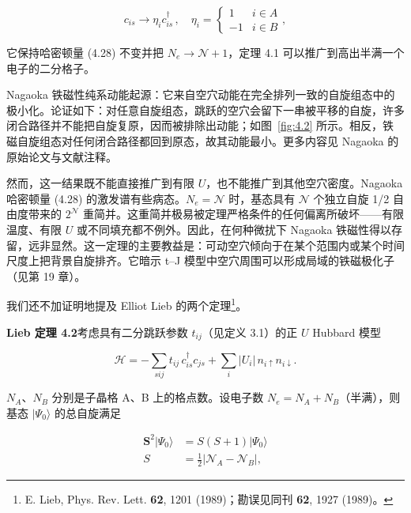\begin{equation*}
c _ {is} \rightarrow \eta_ {i} c _ {is} ^ {\dagger} \, , \quad \eta_ {i} = \left\{\begin{array}{ll}1 & i \in A\\- 1 & i \in B\end{array}\right.,
\tag{4.31}
\end{equation*}

它保持哈密顿量 (4.28) 不变并把 $N_e \to \mathcal{N} + 1$，定理 4.1 可以推广到高出半满一个电子的二分格子。

Nagaoka 铁磁性纯系动能起源：它来自空穴动能在完全排列一致的自旋组态中的极小化。论证如下：对任意自旋组态，跳跃的空穴会留下一串被平移的自旋，许多闭合路径并不能把自旋复原，因而被排除出动能；如图~\ref{fig:4.2} 所示。相反，铁磁自旋组态对任何闭合路径都回到原态，故其动能最小。更多内容见 Nagaoka 的原始论文与文献注释。

然而，这一结果既不能直接推广到有限 $U$，也不能推广到其他空穴密度。Nagaoka 哈密顿量 (4.28) 的激发谱有些病态。$N_{e} = \mathcal{N}$ 时，基态具有 $\mathcal{N}$ 个独立自旋 1/2 自由度带来的 $2^{\mathcal{N}}$ 重简并。这重简并极易被定理严格条件的任何偏离所破坏——有限温度、有限 $U$ 或不同填充都不例外。因此，在何种微扰下 Nagaoka 铁磁性得以存留，远非显然。这一定理的主要教益是：可动空穴倾向于在某个范围内或某个时间尺度上把背景自旋排齐。它暗示 t--J 模型中空穴周围可以形成局域的铁磁极化子（见第 19 章）。

我们还不加证明地提及 Elliot Lieb 的两个定理\footnote{E. Lieb, Phys. Rev. Lett. \textbf{62}, 1201 (1989)；勘误见同刊 \textbf{62}, 1927 (1989)。}。

\medskip
\noindent\textbf{Lieb 定理 4.2}\quad 考虑具有二分跳跃参数 $t_{ij}$（见定义 3.1）的正 $U$ Hubbard 模型

\begin{equation*}
\mathcal {H} = - \sum_ {sij} t _ {ij} \, c _ {is} ^ {\dagger} c _ {js} + \sum_ {i} | U _ {i} | \, n _ {i \uparrow} n _ {i \downarrow}.
\tag{4.32}
\end{equation*}

$N_{A}$、$N_{B}$ 分别是子晶格 A、B 上的格点数。设电子数 $N_{e} = N_{A} + N_{B}$（半满），则基态 $|\Psi_{0}\rangle$ 的总自旋满足

\begin{align*}
\mathbf {S} ^ {2} | \Psi_ {0} \rangle & = S ( S + 1 ) | \Psi_ {0} \rangle\\
S & = \frac {1}{2} \left| \mathcal {N} _ {A} - \mathcal {N} _ {B} \right| ,
\tag{4.33}
\end{align*}

